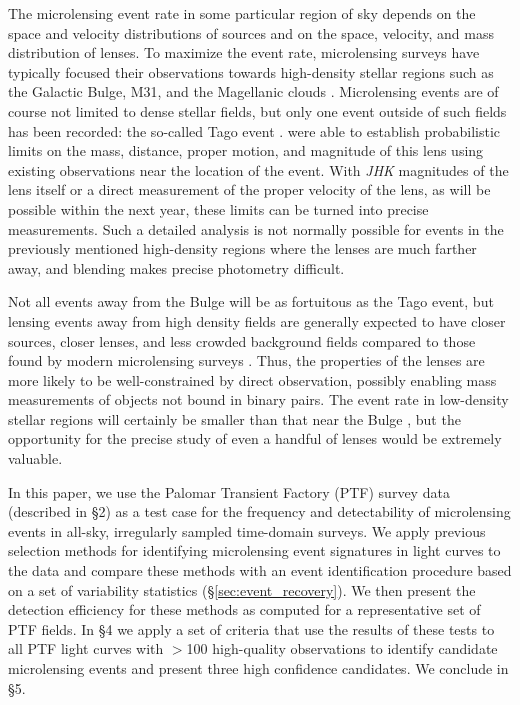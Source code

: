 \documentclass[iop]{emulateapj}
\begin{document}
The microlensing event rate in some particular region of sky depends on the space and velocity distributions of sources and on the space, velocity, and mass distribution of lenses. To maximize the event rate, microlensing surveys have typically focused their observations towards high-density stellar regions such as the Galactic Bulge, M31, and the Magellanic clouds \citep[e.g.][]{original_ogle, original_macho, eros_original, crotts1996}. Microlensing events are of course not limited to dense stellar fields, but only one event outside of such fields has been recorded: the so-called Tago event \citep{fukui2007, gaudi2008}. \cite{gaudi2008} were able to establish probabilistic limits on the mass, distance, proper motion, and magnitude of this lens using existing observations near the location of the event. With \textit{JHK} magnitudes of the lens itself or a direct measurement of the proper velocity of the lens, as will be possible within the next year, these limits can be turned into precise measurements. Such a detailed analysis is not normally possible for events in the previously mentioned high-density regions where the lenses are much farther away, and blending makes precise photometry difficult. 

Not all events away from the Bulge will be as fortuitous as the Tago event, but lensing events away from high density fields are generally expected to have closer sources, closer lenses, and less crowded background fields compared to those found by modern microlensing surveys \citep{mesolensing}. Thus, the properties of the lenses are more likely to be well-constrained by direct observation, possibly enabling mass measurements of objects not bound in binary pairs. The event rate in low-density stellar regions will certainly be smaller than that near the Bulge \citep[e.g.,][]{wood_optical_depth, ogle_optical_depth, macho_optical_depth, eros_optical_depth}, but the opportunity for the precise study of even a handful of lenses would be extremely valuable. 

In this paper, we use the Palomar Transient Factory (PTF) survey data (described in \S2) as a test case for the frequency and detectability of microlensing events in all-sky, irregularly sampled time-domain surveys. We apply previous selection methods for identifying microlensing event signatures in light curves to the data and compare these methods with an event identification procedure based on a set of variability statistics (\S\ref{sec:event_recovery}). We then present the detection efficiency for these methods as computed for a representative set of PTF fields. In \S4 we apply a set of criteria that use the results of these tests to all PTF light curves with $>$100 high-quality observations to identify candidate microlensing events and present three high confidence candidates. We conclude in \S5.
\end{document}
